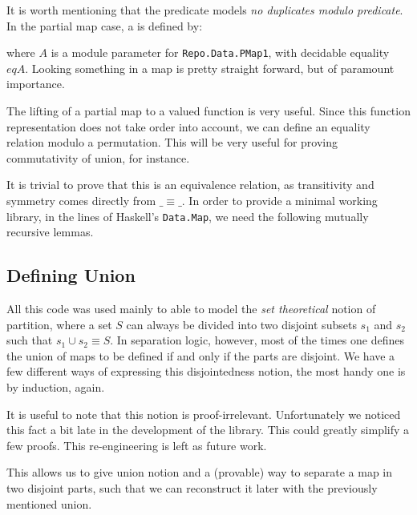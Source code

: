 \documentclass{llncs}
\newcommand{\F}[1]{\AgdaFunction{#1}}
\begin{document}

It is worth mentioning that the \F{noDups-mod} predicate models \emph{no duplicates modulo predicate}. 
In the partial map case, a \F{PMap1} is defined by:


where $A$ is a module parameter for \texttt{\small Repo.Data.PMap1}, with decidable equality $eqA$. 
Looking something in a map is pretty straight forward, but of paramount importance.


The lifting of a partial map to a \F{Maybe} valued function is very useful. Since
this function representation does not take order into account, we can define
an equality relation modulo a permutation. This will be very useful for
proving commutativity of union, for instance.


It is trivial to prove that this is an equivalence relation, as transitivity and
symmetry comes directly from $\_\equiv\_$. In order to provide a minimal working library,
in the lines of Haskell's \texttt{\small Data.Map}, we need the following mutually
recursive lemmas.


\subsection{Defining Union}

All this code was used mainly to able to model the \emph{set theoretical} 
notion of partition, where a set $S$ can always be divided into two disjoint
subsets $s_1$ and $s_2$ such that $s_1 \cup s_2 \equiv S$. In separation logic, 
however, most of the times one defines the union of maps to be defined if and only if
the parts are disjoint. We have a few different ways of expressing this disjointedness
notion, the most handy one is by induction, again.


It is useful to note that this notion is proof-irrelevant. Unfortunately we noticed
this fact a bit late in the development of the library. This could greatly simplify
a few proofs. This re-engineering is left as future work.


This allows us to give union notion and a (provable) way to separate
a map in two disjoint parts, such that we can reconstruct it later with the
previously mentioned union.
\end{document}
